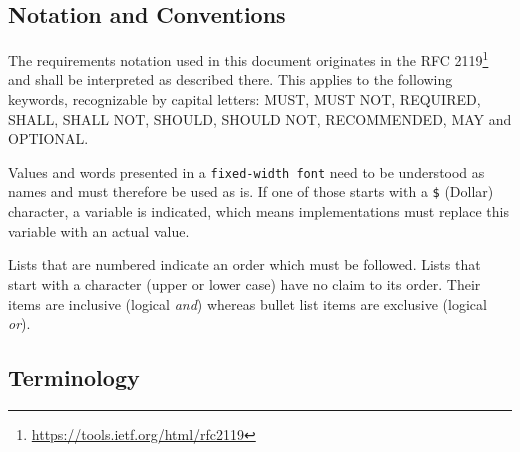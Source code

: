 \documentclass[12pt,english,a4paper,titlepage,cleardoublepage=empty,dottedtoc]{report}
\renewcommand{\href}[2]{#2\footnote{\url{#1}}}
\begin{document}
\subsection*{Notation and Conventions}\label{notation-and-conventions}

The requirements notation used in this document originates in the
\href{https://tools.ietf.org/html/rfc2119}{RFC 2119} and shall be
interpreted as described there. This applies to the following keywords,
recognizable by capital letters: MUST, MUST NOT, REQUIRED, SHALL, SHALL
NOT, SHOULD, SHOULD NOT, RECOMMENDED, MAY and OPTIONAL.

Values and words presented in a \texttt{fixed-width\ font} need to be
understood as names and must therefore be used as is. If one of those
starts with a \texttt{\$} (Dollar) character, a variable is indicated,
which means implementations must replace this variable with an actual
value.

Lists that are numbered indicate an order which must be followed. Lists
that start with a character (upper or lower case) have no claim to its
order. Their items are inclusive (logical \emph{and}) whereas bullet
list items are exclusive (logical \emph{or}).

\subsection*{Terminology}\label{terminology}
\end{document}
